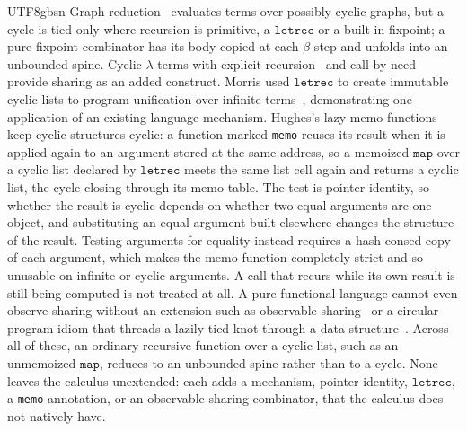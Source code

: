 \begin{CJK*}{UTF8}{gbsn}
  Graph reduction~\cite{wadsworth1971-semantics-lambda-calculus} evaluates terms over possibly cyclic graphs, but a cycle is tied only where recursion is primitive, a $\mathtt{letrec}$ or a built-in fixpoint; a pure fixpoint combinator has its body copied at each $\beta$-step and unfolds into an unbounded spine. Cyclic $\lambda$-terms with explicit recursion~\cite{ariola1997-explicit-recursion} and call-by-need~\cite{ariola1997-call-by-need} provide sharing as an added construct. Morris used $\mathtt{letrec}$ to create immutable cyclic lists to program unification over infinite terms~\cite{morris1978-list-structures-unification}, demonstrating one application of an existing language mechanism. Hughes's lazy memo-functions~\cite{hughes1985-lazy-memo-functions} keep cyclic structures cyclic: a function marked \texttt{memo} reuses its result when it is applied again to an argument stored at the same address, so a memoized $\mathtt{map}$ over a cyclic list declared by $\mathtt{letrec}$ meets the same list cell again and returns a cyclic list, the cycle closing through its memo table. The test is pointer identity, so whether the result is cyclic depends on whether two equal arguments are one object, and substituting an equal argument built elsewhere changes the structure of the result. Testing arguments for equality instead requires a hash-consed copy of each argument, which makes the memo-function completely strict and so unusable on infinite or cyclic arguments. A call that recurs while its own result is still being computed is not treated at all. A pure functional language cannot even observe sharing without an extension such as observable sharing~\cite{gill2009-observable-sharing} or a circular-program idiom that threads a lazily tied knot through a data structure~\cite{bird1984-circular-programs}. Across all of these, an ordinary recursive function over a cyclic list, such as an unmemoized $\mathtt{map}$, reduces to an unbounded spine rather than to a cycle. None leaves the calculus unextended: each adds a mechanism, pointer identity, $\mathtt{letrec}$, a \texttt{memo} annotation, or an observable-sharing combinator, that the calculus does not natively have.
  \fi


\end{CJK*}
